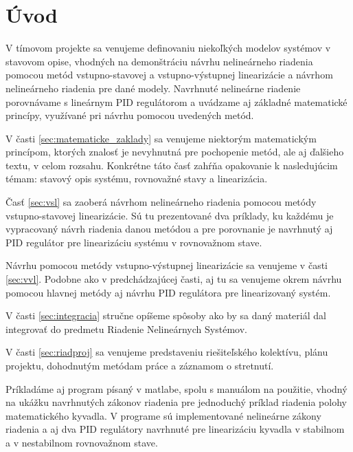 \newpage
{}
{
	\section{Úvod}
}
{
}

    V tímovom projekte sa venujeme definovaniu niekoľkých modelov systémov v stavovom opise, vhodných na demonštráciu návrhu nelineárneho riadenia pomocou metód vstupno-stavovej a vstupno-výstupnej linearizácie a návrhom nelineárneho riadenia pre dané modely. Navrhnuté nelineárne riadenie porovnávame s lineárnym PID regulátorom a uvádzame aj základné matematické princípy, využívané pri návrhu pomocou uvedených metód.

    V časti \ref{sec:matematicke_zaklady} sa venujeme niektorým matematickým princípom, ktorých znalosť je nevyhnutná pre pochopenie metód, ale aj ďalšieho textu, v celom rozsahu. Konkrétne táto časť zahŕňa opakovanie k nasledujúcim témam: stavový opis systému, rovnovažné stavy a linearizácia. 
    
    Časť \ref{sec:vsl} sa zaoberá návrhom nelineárneho riadenia pomocou metódy vstupno-stavovej linearizácie. Sú tu prezentované dva príklady, ku každému je vypracovaný návrh riadenia danou metódou a pre porovnanie je navrhnutý aj PID regulátor pre linearizáciu systému v rovnovažnom stave.

    Návrhu pomocou metódy vstupno-výstupnej linearizácie sa venujeme v časti \ref{sec:vvl}. Podobne ako v predchádzajúcej časti, aj tu sa venujeme okrem návrhu pomocou hlavnej metódy aj návrhu PID regulátora pre linearizovaný systém.

    V časti \ref{sec:integracia} stručne opíšeme spôsoby ako by sa daný materiál dal integrovať do predmetu Riadenie Nelineárnych Systémov.

    V časti \ref{sec:riadproj} sa venujeme predstaveniu riešiteľského kolektívu, plánu projektu, dohodnutým metódam práce a záznamom o stretnutí. 

    Príkladáme aj program písaný v matlabe, spolu s manuálom na použitie, vhodný na ukážku navrhnutých zákonov riadenia pre jednoduchý príklad riadenia polohy matematického kyvadla. V programe sú implementované nelineárne zákony riadenia a aj dva PID regulátory navrhnuté pre linearizáciu kyvadla v stabilnom a v nestabilnom rovnovažnom stave. 


